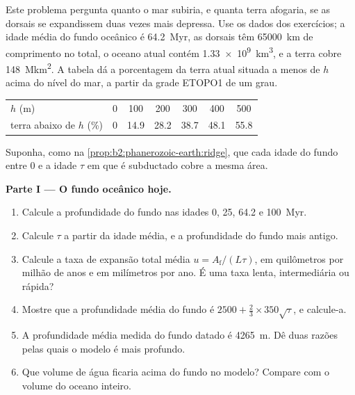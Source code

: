 \begin{problem}\label{pb:b2:phanerozoic-earth:1}
Este problema pergunta quanto o mar subiria, e quanta terra afogaria, se as
dorsais se expandissem duas vezes mais depressa. Use os dados dos exercícios; a idade média do fundo oceânico é
\qty{64.2}{Myr}, as dorsais têm \qty{65000}{km} de comprimento no total, o oceano atual contém
\qty{1.33e9}{km^3}, e a terra cobre \qty{148}{\mega km^2}. A tabela dá a porcentagem da
terra atual situada a menos de $h$ acima do nível do mar, a partir da grade ETOPO1 de um grau.
\begin{center}
\small
\begin{tabular}{lcccccc}
\hline
$h$ (\unit{m}) & 0 & 100 & 200 & 300 & 400 & 500 \\
terra abaixo de $h$ (\unit{\percent}) & 0 & 14.9 & 28.2 & 38.7 & 48.1 & 55.8 \\
\hline
\end{tabular}
\end{center}
Suponha, como na \cref{prop:b2:phanerozoic-earth:ridge}, que cada idade do fundo entre 0 e a
idade $\tau$ em que é subductado cobre a mesma área.

\noindent\textbf{Parte I --- O fundo oceânico hoje.}
\begin{enumerate}
  \item Calcule a profundidade do fundo nas idades 0, 25, 64.2 e \qty{100}{Myr}.
  \item Calcule $\tau$ a partir da idade média, e a profundidade do fundo mais antigo.
  \item Calcule a taxa de expansão total média $u = A_{\text{f}}/(L\tau)$, em quilômetros por milhão
        de anos e em milímetros por ano. É uma taxa lenta, intermediária ou rápida?
  \item Mostre que a profundidade média do fundo é $2500 + \tfrac23 \times 350\sqrt\tau$, e
        calcule-a.
  \item A profundidade média medida do fundo datado é \qty{4265}{m}. Dê duas razões pelas quais o
        modelo é mais profundo.
  \item Que volume de água ficaria acima do fundo no modelo? Compare com o volume do
        oceano inteiro.
\end{enumerate}


\end{problem}
